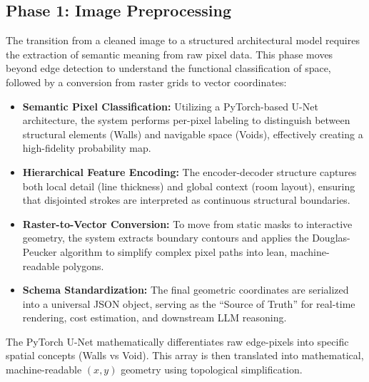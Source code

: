 \documentclass[12pt]{report}
\begin{document}
\subsection{Phase 1: Image Preprocessing}

The transition from a cleaned image to a structured architectural model requires the extraction of semantic meaning from raw pixel data\cite{opencv2024}. This phase moves beyond edge detection\cite{canny1986} to understand the functional classification of space, followed by a conversion from raster grids to vector coordinates\cite{liu2017}:
\begin{itemize}
\item \textbf{Semantic Pixel Classification:} Utilizing a PyTorch-based U-Net architecture\cite{ronneberger2015}, the system performs per-pixel labeling to distinguish between structural elements (Walls) and navigable space (Voids), effectively creating a high-fidelity probability map.
\item \textbf{Hierarchical Feature Encoding:} The encoder-decoder structure\cite{ronneberger2015} captures both local detail (line thickness) and global context (room layout), ensuring that disjointed strokes are interpreted as continuous structural boundaries.
\item \textbf{Raster-to-Vector Conversion:} To move from static masks to interactive geometry, the system extracts boundary contours and applies the Douglas-Peucker algorithm\cite{douglas1973} to simplify complex pixel paths into lean, machine-readable polygons.
\item \textbf{Schema Standardization:} The final geometric coordinates are serialized into a universal JSON object, serving as the ``Source of Truth'' for real-time rendering\cite{threejs2024}, cost estimation\cite{wang2020}, and downstream LLM reasoning\cite{groq2024, brown2020}.
\end{itemize}
The PyTorch U-Net\cite{ronneberger2015} mathematically differentiates raw edge-pixels into specific spatial concepts (Walls vs Void). This array is then translated into mathematical, machine-readable 
$(x,y)$
 geometry using topological simplification\cite{liu2017, douglas1973}.
\end{document}
